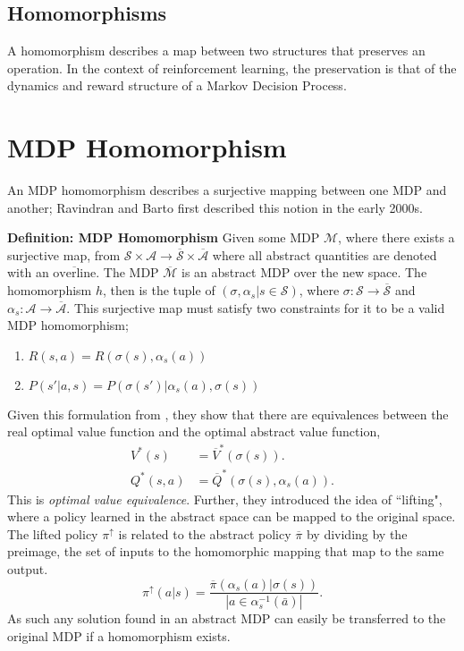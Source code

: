 \subsection{Homomorphisms}
A homomorphism describes a map between two structures that preserves an operation. In the context of reinforcement learning, the preservation is that of the dynamics and reward structure of a Markov Decision Process.

\section{MDP Homomorphism}
An MDP homomorphism describes a surjective mapping between one MDP and another; Ravindran and Barto first described this notion in the early 2000s\cite{ravindran2003smdp,ravindran2001symmetries}.

\textbf{Definition: MDP Homomorphism} Given some MDP $\mathcal{M}$, where there exists a surjective map, from $\mathcal{S} \times \mathcal{A} \rightarrow \overline{\mathcal{S}} \times \overline{\mathcal{A}}$ where all abstract quantities are denoted with an $\overline{\text{overline}}$. The MDP $\overline{\mathcal{M}}$  is an abstract MDP over the new space. The homomorphism $h$, then is the tuple of $(\sigma, \alpha_s|s \in \mathcal{S})$, where $\sigma: \mathcal{S} \rightarrow \overline{\mathcal{S}}$ and $\alpha_s : \mathcal{A} \rightarrow \overline{\mathcal{A}}$. This surjective map must satisfy two constraints for it to be a valid MDP homomorphism;
\begin{enumerate}
	\item $R(s, a) = R(\sigma(s), \alpha_s(a))$
	\item $P(s'| a, s) = P(\sigma(s')| \alpha_s(a), \sigma(s))$
\end{enumerate}

Given this formulation from \cite{vanderpol2020mdp}, they show that there are equivalences between the real optimal value function and the optimal abstract value function,
\begin{align*}
	V^*(s)    & = \overline{V}^*(\sigma(s)).              \\
	Q^*(s, a) & = \overline{Q}^*(\sigma(s), \alpha_s(a)).
\end{align*}
This is \textit{optimal value equivalence}. Further, they introduced the idea of ``lifting", where a policy learned in the abstract space can be mapped to the original space. The lifted policy $\pi^\uparrow$ is related to the abstract policy $\overline{\pi}$ by dividing by the preimage, the set of inputs to the homomorphic mapping that map to the same output.
\begin{equation}
	\pi^\uparrow(a | s) = \frac{\overline{\pi}(\alpha_s(a) | \sigma(s))}{| a \in \alpha^{-1}_s(\bar{a})|}.
\end{equation}
As such any solution found in an abstract MDP can easily be transferred to the original MDP if a homomorphism exists.
